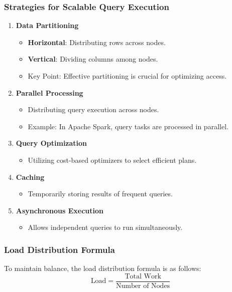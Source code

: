 \documentclass[aspectratio=169]{beamer}
\begin{document}
\begin{frame}[fragile]
    \frametitle{Strategies for Scalable Query Execution}

    \begin{enumerate}
        \item \textbf{Data Partitioning}
        \begin{itemize}
            \item \textbf{Horizontal}: Distributing rows across nodes.
            \item \textbf{Vertical}: Dividing columns among nodes.
            \item Key Point: Effective partitioning is crucial for optimizing access.
        \end{itemize}

        \item \textbf{Parallel Processing}
        \begin{itemize}
            \item Distributing query execution across nodes.
            \item Example: In Apache Spark, query tasks are processed in parallel.
        \end{itemize}

        \item \textbf{Query Optimization}
        \begin{itemize}
            \item Utilizing cost-based optimizers to select efficient plans.
        \end{itemize}

        \item \textbf{Caching}
        \begin{itemize}
            \item Temporarily storing results of frequent queries.
        \end{itemize}

        \item \textbf{Asynchronous Execution}
        \begin{itemize}
            \item Allows independent queries to run simultaneously.
        \end{itemize}
        
    \end{enumerate}

\end{frame}

\begin{frame}[fragile]
    \frametitle{Load Distribution Formula}

    To maintain balance, the load distribution formula is as follows:
    \begin{equation}
        \text{Load} = \frac{\text{Total Work}}{\text{Number of Nodes}}
    \end{equation}

\end{frame}
\end{document}
